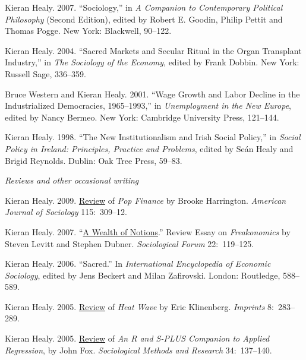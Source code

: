 \documentclass[11pt]{article}
\begin{document}
\ind Kieran Healy. 2007. ``Sociology,'' in \emph{A Companion to Contemporary Political Philosophy} (Second Edition), edited by Robert E. Goodin, Philip Pettit and Thomas Pogge. New York: Blackwell, 90--122. 

\ind  Kieran Healy. 2004. ``Sacred Markets and Secular Ritual in the Organ Transplant
Industry,'' in \emph{The Sociology of the Economy}, edited by Frank Dobbin. New
York: Russell Sage, 336--359.

\ind Bruce Western and Kieran Healy.  2001.  ``Wage Growth and Labor Decline in the
Industrialized Democracies, 1965--1993,'' in \emph{Unemployment in the New
  Europe}, edited by Nancy Bermeo. New York: Cambridge University Press,
121--144.

 \ind  Kieran Healy. 1998. ``The New Institutionalism and Irish Social Policy,'' in
\emph{Social Policy in Ireland: Principles, Practice and Problems}, edited by
Se\'{a}n Healy and Brigid Reynolds. Dublin: Oak Tree Press, 59--83.


\bigskip 
 
\noindent\emph{Reviews and other occasional writing \vspace{0.05in}}

\ind Kieran Healy. 2009. \href{http://www.journals.uchicago.edu/doi/pdf/10.1086/605757}{Review} of \emph{Pop Finance} by Brooke Harrington. \emph{American Journal of Sociology} 115:~309--12.

\ind Kieran Healy. 2007. ``\href{http://www.kieranhealy.org/files/reviews/socforum-article.pdf}{A Wealth of Notions}.'' Review
Essay on \emph{Freakonomics} by Steven Levitt and Stephen Dubner. \emph{Sociological Forum} 22:~119--125. 

\ind  Kieran Healy. 2006. ``Sacred.'' In \emph{International Encyclopedia of Economic Sociology}, edited by Jens Beckert and Milan Zafirovski. London: Routledge, 588--589. 

\ind  Kieran Healy. 2005. \href{http://www.kieranhealy.org/files/reviews/klinenberg.pdf}{Review} of \emph{Heat Wave} by Eric Klinenberg. \emph{Imprints} 8:~283--289.

\ind  Kieran Healy. 2005. \href{http://www.kieranhealy.org/files/reviews/fox.pdf}{Review} of \emph{An R and S-PLUS Companion to Applied Regression}, by John Fox. \emph{Sociological Methods and Research} 34:~137--140.
\end{document}
